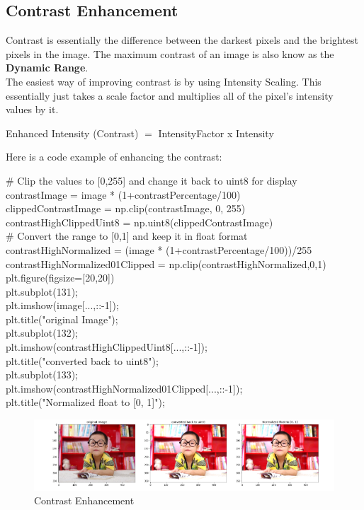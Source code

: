 \documentclass[fleqn]{article}
\begin{document}
    \subsection{Contrast Enhancement}
    Contrast is essentially the difference between the darkest pixels and the brightest pixels in the image. The maximum contrast of an image is also know as the \textbf{Dynamic Range}.\\
    The easiest way of improving contrast is by using Intensity Scaling. This essentially just takes a scale factor and multiplies all of the pixel's intensity values by it.
    \begin{center}
      Enhanced Intensity (Contrast) $=$ IntensityFactor x Intensity
    \end{center}
    Here is a code example of enhancing the contrast:
    \begin{center}
      \# Clip the values to [0,255] and change it back to uint8 for display\\
      contrastImage = image * (1+contrastPercentage/100)\\
      clippedContrastImage = np.clip(contrastImage, 0, 255)\\
      contrastHighClippedUint8 = np.uint8(clippedContrastImage)\\

      \# Convert the range to [0,1] and keep it in float format\\
      contrastHighNormalized = (image * (1+contrastPercentage/100))/255\\
      contrastHighNormalized01Clipped = np.clip(contrastHighNormalized,0,1)\\

      plt.figure(figsize=[20,20])\\
      plt.subplot(131);\\
      plt.imshow(image[...,::-1]);\\
      plt.title("original Image");\\
      plt.subplot(132);\\
      plt.imshow(contrastHighClippedUint8[...,::-1]);\\
      plt.title("converted back to uint8");\\
      plt.subplot(133);\\
      plt.imshow(contrastHighNormalized01Clipped[...,::-1]);\\
      plt.title("Normalized float to [0, 1]");\\

      \begin{figure}[h]
        \centering
        \includegraphics{"Contrast Enhancement.png"}
        \caption{Contrast Enhancement}
        \label{ContrastEnhancement}
      \end{figure}
    \end{center}
\end{document}
